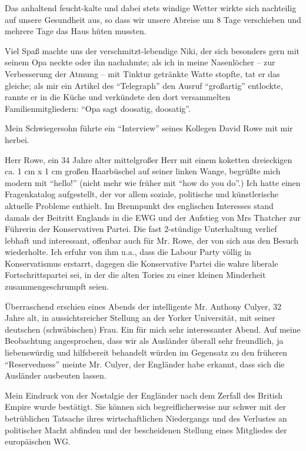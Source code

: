 Das anhaltend feucht-kalte und dabei stets windige Wetter wirkte sich nachteilig auf unsere Gesundheit aus, so dass wir unsere Abreise um 8 Tage verschieben und mehrere Tage das Haus hüten mussten.

Viel Spaß machte uns der verschmitzt-lebendige Niki, der sich besonders gern mit seinem Opa neckte oder ihn nachahmte; als ich in meine Nasenlöcher -- zur Verbesserung der Atmung -- mit Tinktur getränkte Watte stopfte, tat er das gleiche; als mir ein Artikel des \enquote{Telegraph} den Ausruf \enquote{großartig} entlockte, rannte er in die Küche und verkündete den dort versammelten Familienmitgliedern: \enquote{Opa sagt doosatig, doosatig}.

Mein Schwiegersohn führte ein \enquote{Interview} seines Kollegen David Rowe mit mir herbei.

Herr Rowe, ein 34 Jahre alter mittelgroßer Herr mit einem koketten dreieckigen ca. 1 cm x 1 cm großen Haarbüschel auf seiner linken Wange, begrüßte mich modern mit \enquote{hello!} (nicht mehr wie früher mit \enquote{how do you do}.) Ich hatte einen Fragenkatalog aufgestellt, der vor allem soziale, politische und künstlerische aktuelle Probleme enthielt. Im Brennpunkt des englischen Interesses stand damals der Beitritt Englands in die EWG und der Aufstieg von Mrs Thatcher zur Führerin der Konservativen Partei. Die fast 2-stündige Unterhaltung verlief lebhaft und interessant, offenbar auch für Mr. Rowe, der von sich aus den Besuch wiederholte. Ich erfuhr von ihm u.a., dass die Labour Party völlig in Konservatismus erstarrt, dagegen die Konservative Partei die wahre liberale Fortschrittspartei sei, in der die alten Tories zu einer kleinen Minderheit zusammengeschrumpft seien.

Überraschend erschien eines Abends der intelligente Mr. Anthony Culyer, 32 Jahre alt, in aussichtsreicher Stellung an der Yorker Universität, mit seiner deutschen (schwäbischen) Frau. Ein für mich sehr interessanter Abend. Auf meine Beobachtung angesprochen, dass wir als Ausländer überall sehr freundlich, ja liebenswürdig und hilfsbereit behandelt würden im Gegensatz zu den früheren \enquote{Reservedness} meinte Mr. Culyer, der Engländer habe erkannt, dass sich die Ausländer ausbeuten lassen.

Mein Eindruck von der Nostalgie der Engländer nach dem Zerfall des British Empire wurde bestätigt. Sie können sich begreiflicherweise nur schwer mit der betrüblichen Tatsache ihres wirtschaftlichen Niedergangs und des Verlustes an politischer Macht abfinden und der bescheidenen Stellung eines Mitgliedes der europäischen WG.

